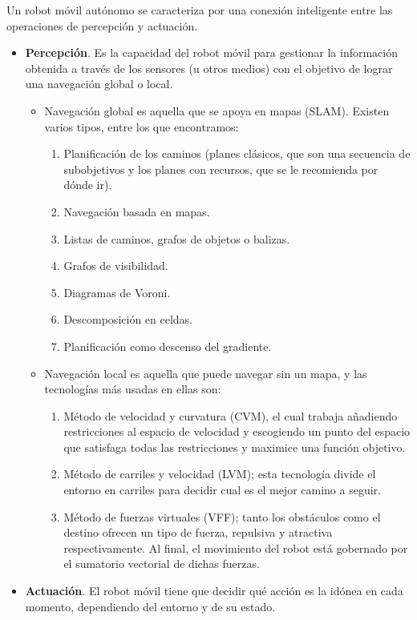 \begin{itemize}
Un robot móvil autónomo se caracteriza por una conexión inteligente entre las operaciones de percepción y actuación.
\begin{itemize}
  \item \textbf{Percepción}. Es la capacidad del robot móvil para gestionar la información obtenida a través de los sensores (u otros medios) con el objetivo de lograr una navegación global o local.
   \begin{itemize}
    \item Navegación global es aquella que se apoya en mapas (SLAM). Existen varios tipos, entre los que encontramos:
      \begin{enumerate}
	\item Planificación de los caminos (planes clásicos, que son una secuencia de subobjetivos y los planes con recursos, que se le recomienda por dónde ir).
	\item Navegación basada en mapas.
	\item Listas de caminos, grafos de objetos o balizas.
	\item Grafos de visibilidad.
	\item Diagramas de Voroni.
	\item Descomposición en celdas.
	\item Planificación como descenso del gradiente.
      \end{enumerate}
    \item Navegación local es aquella que puede navegar sin un mapa, y las tecnologías más usadas en ellas son:
      \begin{enumerate}
	\item Método de velocidad y curvatura (CVM), el cual trabaja añadiendo restricciones al espacio de velocidad y escogiendo un punto del espacio que satisfaga todas las restricciones y maximice una función objetivo.
	\item Método de carriles y velocidad (LVM); esta tecnología divide el entorno en carriles para decidir cual es el mejor camino a seguir.
	\item Método de fuerzas virtuales (VFF); tanto los obstáculos como el destino ofrecen un tipo de fuerza, repulsiva y atractiva respectivamente. Al final, el movimiento del robot está gobernado por el sumatorio vectorial de dichas fuerzas.
      \end{enumerate}
   \end{itemize}
  \item \textbf{Actuación}. El robot móvil tiene que decidir qué acción es la idónea en cada momento, dependiendo del entorno y de su estado.
\end{itemize}
\end{itemize}


